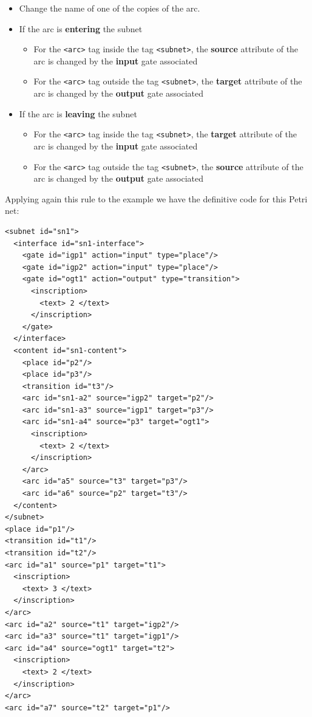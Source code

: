 \begin{itemize}
\item Change the name of one of the copies of the arc.
\item If the arc is \textbf{entering} the subnet
  \begin{itemize}
  \item For the \texttt{<arc>} tag inside the tag \texttt{<subnet>}, the \textbf{source} attribute of the arc is changed by the \textbf{input} gate associated
  \item For the \texttt{<arc>} tag outside the tag \texttt{<subnet>}, the \textbf{target} attribute of the arc is changed by the \textbf{output} gate associated
  \end{itemize}
\item If the arc is \textbf{leaving} the subnet
  \begin{itemize}
  \item For the \texttt{<arc>} tag inside the tag \texttt{<subnet>}, the \textbf{target} attribute of the arc is changed by the \textbf{input} gate associated
  \item For the \texttt{<arc>} tag outside the tag \texttt{<subnet>}, the \textbf{source} attribute of the arc is changed by the \textbf{output} gate associated
  \end{itemize}
\end{itemize}

Applying again this rule to the example we have the definitive code for this
Petri net:

\begin{lstlisting}[label=pmnl_final_representation,caption=Final PNML representation]
<subnet id="sn1">
  <interface id="sn1-interface">
    <gate id="igp1" action="input" type="place"/>
    <gate id="igp2" action="input" type="place"/>
    <gate id="ogt1" action="output" type="transition">
      <inscription>
        <text> 2 </text>
      </inscription>
    </gate>
  </interface>
  <content id="sn1-content">
    <place id="p2"/>
    <place id="p3"/>
    <transition id="t3"/>
    <arc id="sn1-a2" source="igp2" target="p2"/>
    <arc id="sn1-a3" source="igp1" target="p3"/>
    <arc id="sn1-a4" source="p3" target="ogt1">
      <inscription>
        <text> 2 </text>
      </inscription>
    </arc>
    <arc id="a5" source="t3" target="p3"/>
    <arc id="a6" source="p2" target="t3"/>
  </content>
</subnet>
<place id="p1"/>
<transition id="t1"/>
<transition id="t2"/>
<arc id="a1" source="p1" target="t1">
  <inscription>
    <text> 3 </text>
  </inscription>
</arc>
<arc id="a2" source="t1" target="igp2"/>
<arc id="a3" source="t1" target="igp1"/>
<arc id="a4" source="ogt1" target="t2">
  <inscription>
    <text> 2 </text>
  </inscription>
</arc>
<arc id="a7" source="t2" target="p1"/>
\end{lstlisting}

